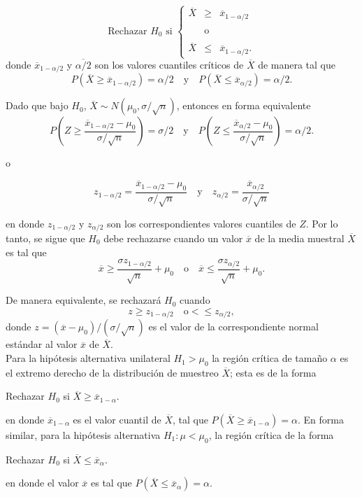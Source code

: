 $$
\mbox{Rechazar } H_0 \mbox{ si }
\left\{
    \begin{array}{rcl}
	\overline{X}&\geq&\overline{x}_{1-\alpha/2}\\\\
		    &\mbox{o}&\\\\
	\overline{X}&\leq&\overline{x}_{1-\alpha/2}.
    \end{array}
\right.
$$
donde $\overline{x}_{1-\alpha/2}$ y $\overline{\alpha/2}$ son los valores cuantiles críticos de $\overline{X}$ de manera tal que
$$P(\overline{X}\geq \overline{x}_{1-\alpha/2})=\alpha/2 \quad \mbox{y}\quad P(\overline{X}\leq \overline{x}_{\alpha/2})=\alpha/2.$$

Dado que bajo $H_0$, $\overline{X}\sim N(\mu_0,\sigma/\sqrt{n})$, entonces en forma equivalente
$$P\left(Z\geq \dfrac{\overline{x}_{1-\alpha/2}-\mu_0}{\sigma/\sqrt{n}}\right)=\sigma/2\quad \mbox{y}\quad P\left(Z\leq \dfrac{\overline{x}_{\alpha/2}-\mu_0}{\sigma/\sqrt{n}}\right)=\alpha/2.$$

o

$$z_{1-\alpha/2} = \dfrac{\overline{x}_{1-\alpha/2}-\mu_0}{\sigma/\sqrt{n}} \quad \mbox{y} \quad z_{\alpha/2}=\dfrac{\overline{x}_{\alpha/2}}{\sigma/\sqrt{n}}$$

en donde $z_{1-\alpha/2}$ y $z_{\alpha/2}$ son los correspondientes valores cuantiles de $Z$. Por lo tanto, se sigue que $H_0$ debe rechazarse cuando un valor $\overline{x}$ de la media muestral $\overline{X}$ es tal que
$$\overline{x}\geq \dfrac{\sigma z_{1-\alpha/2}}{\sqrt{n}} + \mu_0\quad \mbox{o}\quad \overline{x}\leq \dfrac{\sigma z_{\alpha/2}}{\sqrt{n}}+\mu_0.$$

De manera equivalente, se rechazará $H_0$ cuando
$$z\geq z_{1-\alpha/2}\quad \mbox{o} <\leq z_{\alpha/2},$$
donde $z=(\overline{x}-\mu_0)/(\sigma/\sqrt{n})$ es el valor de la correspondiente normal estándar al valor $\overline{x}$ de $\overline{X}$.\\

Para la hipótesis alternativa unilateral $H_1>\mu_0$ la región crítica de tamaño $\alpha$ es el extremo derecho de la distribución de muestreo $\overline{X}$; esta es de la forma 
\begin{center}
    Rechazar $H_0$ si $\overline{X}\geq \overline{x}_{1-\alpha}.$
\end{center}
en donde $\overline{x}_{1-\alpha}$ es el valor cuantil de $\overline{X}$, tal que $P\left(\overline{X}\geq \overline{x}_{1-\alpha}\right)=\alpha$. En forma similar, para la hipótesis alternativa $H_1:\mu<\mu_0$, la región crítica de la forma
\begin{center}
    Rechazar $H_0$ si $\overline{X}\leq \overline{x}_{\alpha}.$
\end{center}
en donde el valor $\overline{x}$ es tal que $P(\overline{X}\leq \overline{x}_\alpha)=\alpha.$

